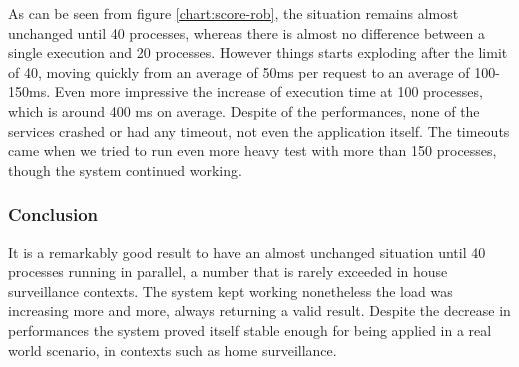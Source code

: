 As can be seen from figure \ref{chart:score-rob}, the situation remains almost unchanged until 40 processes,
whereas there is almost no difference between a single execution and 20 processes. However
things starts exploding after the limit of 40, moving quickly from an average of 50ms per request
to an average of 100-150ms. Even more impressive the increase of execution time at 100 processes, which is around
400 ms on average.\newline
Despite of the performances, none of the services crashed or had any timeout, not even the application itself. The timeouts
came when we tried to run even more heavy test with more than 150 processes, though the system continued working.\newline

\subsubsection{Conclusion}

It is a remarkably good result to have an almost unchanged situation until 40 processes running in parallel,
a number that is rarely exceeded in house surveillance contexts. The system kept working nonetheless the
load was increasing more and more, always returning a valid result. Despite the decrease in performances
the system proved itself stable enough for being applied in a real world scenario, in contexts
such as home surveillance.
